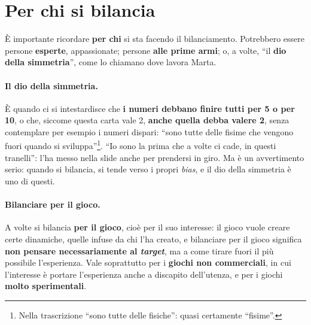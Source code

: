 \section{Per chi si bilancia}
\label{a14:sec:perchi}

È importante ricordare \textbf{per chi} si sta facendo il bilanciamento. Potrebbero essere
persone \textbf{esperte}, appassionate; persone \textbf{alle prime armi}; o, a volte, ``il
\textbf{dio della simmetria}'', come lo chiamano dove lavora Marta.

\paragraph{Il dio della simmetria.} È quando ci si intestardisce che \textbf{i numeri debbano
finire tutti per 5 o per 10}, o che, siccome questa carta vale 2, \textbf{anche quella debba
valere 2}, senza contemplare per esempio i numeri dispari: ``sono tutte delle fisime che vengono
fuori quando si sviluppa''\footnote{Nella trascrizione ``sono tutte delle fisiche'': quasi
certamente ``fisime''.}. ``Io sono la prima che a volte ci cade, in questi tranelli'': l'ha
messo nella slide anche per prendersi in giro. Ma è un avvertimento serio: quando si bilancia,
si tende verso i propri \emph{bias}, e il dio della simmetria è uno di questi.

\paragraph{Bilanciare per il gioco.} A volte si bilancia \textbf{per il gioco}, cioè per il suo
interesse: il gioco vuole creare certe dinamiche, quelle infuse da chi l'ha creato, e
bilanciare per il gioco significa \textbf{non pensare necessariamente al \emph{target}}, ma a
come tirare fuori il più possibile l'esperienza. Vale soprattutto per i \textbf{giochi non
commerciali}, in cui l'interesse è portare l'esperienza anche a discapito dell'utenza, e per
i giochi \textbf{molto sperimentali}.

